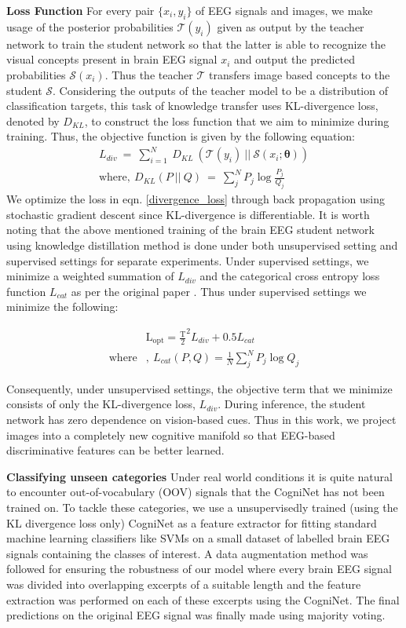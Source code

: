 \documentclass{article}
\begin{document}
\textbf{Loss Function }
For every pair $\{x_i, y_i\}$ of EEG signals and images, we make usage of the posterior probabilities $\mathcal{T}(y_{i})$ given as output by the teacher network to train the student network so that the latter is able to recognize the visual concepts present in brain EEG signal $x_i$ and output the predicted probabilities $\mathcal{S}(x_{i})$. Thus the teacher $\mathcal{T}$ transfers image based concepts to the student $\mathcal{S}$. Considering the outputs of the teacher model to be a distribution of classification targets, this task of knowledge transfer uses KL-divergence loss, denoted by $D_{KL}$, to construct the loss function that we aim to minimize during training. Thus, the objective function is given by the following equation:
\begin{align}
\label{divergence_loss}
L_{div}\ =\ \sum_{i=1}^N \ D_{KL}\ (\mathcal{T}(y_{i})\ ||\ \mathcal{S} (x_{i};\mathbf{\theta}))    \\
\mathrm{where}, \ \label{KL_divergence}
D_{KL}( P\ ||\ Q)\ =\ \sum_j^N P_j\log \frac{P_j}{Q_j} 
\end{align}
We optimize the loss in eqn. \ref{divergence_loss} through back propagation using stochastic gradient descent since KL-divergence is differentiable. 
It is  worth noting that the above mentioned training of the brain EEG student network using knowledge distillation method is done under both unsupervised setting and supervised settings for separate experiments.  Under supervised settings, we minimize a weighted summation of $L_{div}$ and the categorical cross entropy loss function $L_{cat}$ as per the original paper \cite{hinton2015distilling}. Thus under supervised settings we minimize the following:

\begin{align}
\label{eq:total_loss}
&\mathrm{L_{opt}} =  \frac{\mathrm{T}}{2}^2 L_{div} + 0.5L_{cat} \\
\mathrm{where}&, \ L_{cat}(P,Q) = \frac{1}{N} \sum_j^N P_j \log Q_j
\end{align}

Consequently, under unsupervised settings, the objective term that we minimize consists of only the KL-divergence loss, $L_{div}$. During inference, the student network has zero dependence on vision-based cues. Thus in this work, we project images into a completely new cognitive manifold so that EEG-based discriminative features can be better learned. 

\textbf{Classifying unseen categories}
Under real world conditions it is quite natural to encounter out-of-vocabulary (OOV) signals that the CogniNet has not been trained on. To tackle these categories, we use a unsupervisedly trained (using the KL divergence loss only) CogniNet as a feature extractor for fitting standard machine learning classifiers like SVMs on a small dataset of labelled brain EEG signals containing the classes of interest. A data augmentation method was followed for ensuring the robustness of our model where every brain EEG signal was divided into overlapping excerpts of a suitable length and the feature extraction was performed on each of these excerpts using the CogniNet. The final predictions on the original EEG signal was finally made using majority voting. 
\end{document}
